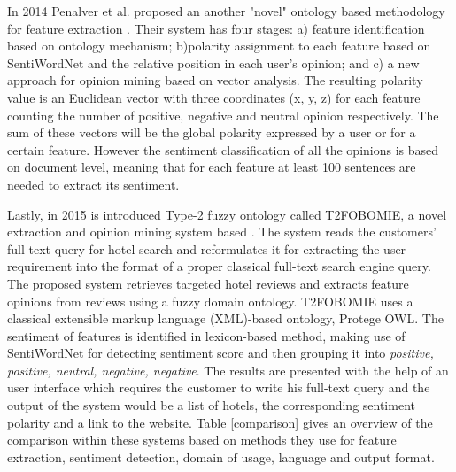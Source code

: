 In 2014 Penalver et al. proposed an another "novel" ontology based methodology for feature extraction \cite{penalver2014feature}. Their system has four stages: a) feature identification based on ontology mechanism; b)polarity assignment to each feature based on SentiWordNet and the relative position in each user's opinion; and c) a new approach for opinion mining based on vector analysis. The resulting polarity value is an Euclidean vector with three coordinates (x, y, z) for each feature counting the number of positive, negative and neutral opinion respectively. The sum of these vectors will be the global polarity expressed by a user or for a certain feature. However the sentiment classification of all the opinions is based on document level, meaning that for each feature at least 100 sentences are needed to extract its sentiment.

Lastly, in 2015 is introduced Type-2 fuzzy ontology called T2FOBOMIE, a novel extraction and opinion mining system based \cite{ali2015type}. The system reads the  customers' full-text query for hotel search and reformulates it for extracting the user requirement into the format of a proper classical full-text search engine query. The proposed system retrieves targeted hotel reviews and extracts feature opinions from reviews using a fuzzy domain ontology. T2FOBOMIE uses a classical extensible markup language (XML)-based ontology, Protege OWL. The sentiment of features is identified in lexicon-based method, making use of SentiWordNet for detecting sentiment score and then grouping it into \textit{positive, positive, neutral, negative, negative}. The results are presented with the help of an user interface which requires the customer to write his full-text query and the output of the system would be a list of hotels, the corresponding sentiment polarity and a link to the website. Table \ref{comparison} gives an overview of the comparison within these systems based on methods they use for feature extraction, sentiment detection, domain of usage, language and output format.

